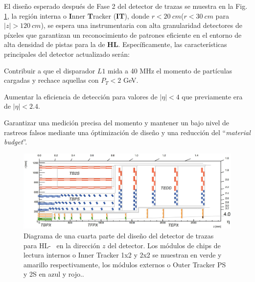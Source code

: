 El diseño esperado después de Fase 2 del detector de trazas se muestra en la Fig. \ref{track}, la región interna o \textbf{I}nner \textbf{T}racker (\textbf{IT}), donde $r < 20 ~ cm$($r < 30 ~ cm$ para $|z|> 120 ~ cm$), se espera una instrumentaria con alta granularidad detectores de píxeles que garantizan un reconocimiento de patrones eficiente en el entorno de alta densidad de pistas para la de \textbf{HL}. %
Específicamente, las características principales del detector actualizado serán:
\begin{itemize_f}
\item Contribuir a que el disparador $L1$ mida a 40 MHz el momento de partículas cargadas y rechace aquellas con $P_T < 2$ GeV.
\item Aumentar la eficiencia de detección para valores de $|\eta| < 4$ que previamente era de $|\eta| < 2.4$. 
\item Garantizar una medición precisa del momento y mantener un bajo nivel de rastreos falsos mediante una óptimización de diseño y una reducción del ``\textit{material budget}''.
\end{itemize_f}

\begin{figure}[!h]
\centering
\includegraphics[width=.95\textwidth]{Cap2/imagenes/track.png}
\caption[Diagrama de una cuarta parte del diseño del detector de trazas \CMS ~ para \LHC ~ en la dirección $z$ del mismo. Los módulos de chips de lectura internos o Inner Tracker 1x2 y 2x2 se muestran en verde y amarillo respectivamente, los módulos externos o Outer Tracker PS y 2S en azul y rojo.]{Diagrama de una cuarta parte del diseño del detector de trazas \CMS ~ para HL-\LHC ~ en la dirección $z$ del detector. Los módulos de chips de lectura internos o Inner Tracker 1x2 y 2x2 se muestran en verde y amarillo respectivamente, los módulos externos o Outer Tracker PS y 2S en azul y rojo.\footnotemark.}
\label{track}
\end{figure}

